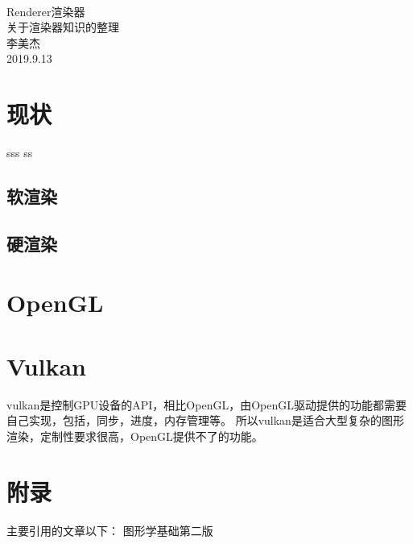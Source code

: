 \documentclass[UTF8]{article}
\begin{document}
\begin{center}
    \quad \\
    \vspace{3cm}
    \hspace{1cm}\Huge{Renderer渲染器} \\
    \small{关于渲染器知识的整理} \\
    \vspace{1cm}
    \hspace{1cm}\Large{李美杰} \\
    \vspace{0.5cm}
    \hspace{1cm}\Large{2019.9.13}
    \clearpage
\end{center}

\thispagestyle{empty}
\clearpage

\tableofcontents
\clearpage

\lstset{
    language=C,
    numbers=left,
    frame=box
}







\clearpage
\section{现状}
sss ss 
\subsection{软渲染}


\subsection{硬渲染}

\section{OpenGL}

\clearpage
\section{Vulkan}
vulkan是控制GPU设备的API，相比OpenGL，由OpenGL驱动提供的功能都需要自己实现，包括，同步，进度，内存管理等。
所以vulkan是适合大型复杂的图形渲染，定制性要求很高，OpenGL提供不了的功能。


\clearpage
\section{附录}
主要引用的文章以下：
\cite{RAPI}
\cite{Renderer}
\cite{FoCG2Ed} 图形学基础第二版



\end{document}
